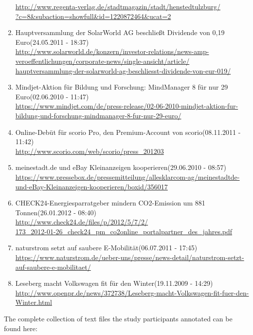 \begin{enumerate}
    \url{http://www.regenta-verlag.de/stadtmagazin/stadt/henstedtulzburg/} \\
    \url{?c=8&subaction=showfull&id=1220872464&ucat=2}
    \item \lqq Hauptversammlung der SolarWorld AG beschließt Dividende von 0,19 Euro\rqq (24.05.2011 - 18:37) \\
    \url{http://www.solarworld.de/konzern/investor-relations/news-amp-} \\
    \url{veroeffentlichungen/corporate-news/single-ansicht/article/} \\
    \url{hauptversammlung-der-solarworld-ag-beschliesst-dividende-von-eur-019/}
    \item \lqq Mindjet-Aktion für Bildung und Forschung: MindManager 8 für nur 29 Euro\rqq (02.06.2010 - 11:47) \\
    \url{https://www.mindjet.com/de/press-release/02-06-2010-mindjet-aktion-fur-bildung-und-forschung-mindmanager-8-fur-nur-29-euro/}
    \item \lqq Online-Debüt für scorio Pro, den Premium-Account von scorio\rqq (08.11.2011 - 11:42) \\
    \url{http://www.scorio.com/web/scorio/press_201203}
    \item \lqq meinestadt.de und eBay Kleinanzeigen kooperieren\rqq (29.06.2010 - 08:57) \\
    \url{https://www.pressebox.de/pressemitteilung/allesklarcom-ag/meinestadtde-und-eBay-Kleinanzeigen-kooperieren/boxid/356017}
    \item \lqq CHECK24-Energiesparratgeber mindern CO2-Emission um 881 Tonnen\rqq (26.01.2012 - 08:40) \\
    \url{http://www.check24.de/files/p/2012/5/7/2/} \\
    \url{173_2012-01-26_check24_pm_co2online_portalpartner_des_jahres.pdf}
    \item \lqq naturstrom setzt auf saubere E-Mobilität\rqq (06.07.2011 - 17:45) \\
    \url{https://www.naturstrom.de/ueber-uns/presse/news-detail/naturstrom-setzt-auf-saubere-e-mobilitaet/}
    \item \lqq Leseberg macht Volkswagen fit für den Winter\rqq (19.11.2009 - 14:29) \\
    \url{http://www.openpr.de/news/372738/Leseberg-macht-Volkswagen-fit-fuer-den-Winter.html}
  \end{enumerate}

  The complete collection of text files the study participants annotated can be found here: \\ 

